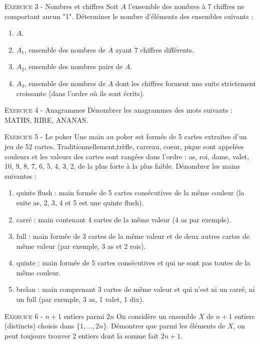 

\vskip0.3cm\noindent\textsc{Exercice 3} - Nombres et chiffres
\vskip0.2cm
Soit $A$ l'ensemble des nombres à 7 chiffres ne comportant aucun "1". Déterminer le nombre d'éléments des ensembles suivants :
\begin{enumerate}
\item $A$.
\item $A_1$, ensemble des nombres de $A$ ayant 7 chiffres différents.
\item $A_2$, ensemble des nombres pairs de $A$.
\item $A_3$, ensemble des nombres de $A$ dont les chiffres forment une suite strictement croissante (dans l'ordre où ils sont écrits).
\end{enumerate}




\vskip0.3cm\noindent\textsc{Exercice 4} - Anagrammes
\vskip0.2cm
Dénombrer les anagrammes des mots suivants : MATHS, RIRE, ANANAS.




\vskip0.3cm\noindent\textsc{Exercice 5} - Le poker
\vskip0.2cm
Une main au poker est formée de 5 cartes extraites d'un jeu de 52 cartes. Traditionnellement,trèfle, carreau, coeur, pique sont appelées couleurs et les valeurs des cartes sont rangées dans l'ordre : as, roi, dame, valet, 10, 9, 8, 7, 6, 5, 4, 3, 2, de la plus forte à la plus faible. Dénombrer les mains suivantes :
\begin{enumerate}
\item quinte flush : main formée de 5 cartes consécutives de la même couleur (la suite as, 2, 3, 4 et 5 est une quinte flush).
\item carré : main contenant 4 cartes de la même valeur (4 as par exemple).
\item full : main formée de 3 cartes de la même valeur et de deux autres cartes de même valeur (par exemple, 3 as et 2 rois).
\item quinte : main formée de 5 cartes consécutives et qui ne sont pas toutes de la même couleur.
\item brelan : main comprenant 3 cartes de même valeur et qui n'est ni un carré, ni un full (par exemple, 3 as, 1 valet, 1 dix).
\end{enumerate}




\vskip0.3cm\noindent\textsc{Exercice 6} - $n+1$ entiers parmi $2n$
\vskip0.2cm
On considère un ensemble $X$ de $n+1$ entiers (distincts) choisis dans $\{1,\dots,2n\}$. Démontrer que parmi les éléments de $X$, on peut toujours trouver $2$ entiers dont la somme fait $2n+1$.


